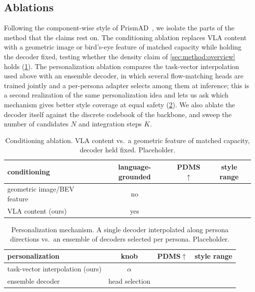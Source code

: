 \subsection{Ablations}
\label{sec:exp:ablate}
Following the component-wise style of PrismAD~\cite{prismad}, we isolate the parts of
the method that the claims rest on. The conditioning ablation replaces VLA content
with a geometric image or bird's-eye feature of matched capacity while holding the
decoder fixed, testing whether the density claim of \cref{sec:method:overview} holds
(\cref{tab:ablate_cond}). The personalization ablation compares the task-vector
interpolation used above with an ensemble decoder, in which several flow-matching
heads are trained jointly and a per-persona adapter selects among them at inference;
this is a second realization of the same personalization idea and lets us ask which
mechanism gives better style coverage at equal safety (\cref{tab:ablate_mech}). We
also ablate the decoder itself against the discrete codebook of the backbone, and
sweep the number of candidates $N$ and integration steps $K$.

\begin{table}[t]
    \centering
    \small
    \setlength{\tabcolsep}{5pt}
    \begin{tabular}{lccc}
        \toprule
        conditioning & language-grounded & PDMS$\uparrow$ & style range \\
        \midrule
        geometric image/BEV feature & no  & \TODO{} & \TODO{} \\
        VLA content (ours)          & yes & \TODO{} & \TODO{} \\
        \bottomrule
    \end{tabular}
    \caption{Conditioning ablation. VLA content vs.\ a geometric feature of matched
    capacity, decoder held fixed. Placeholder.}
    \label{tab:ablate_cond}
\end{table}

\begin{table}[t]
    \centering
    \small
    \setlength{\tabcolsep}{5pt}
    \begin{tabular}{lccc}
        \toprule
        personalization & knob & PDMS$\uparrow$ & style range \\
        \midrule
        task-vector interpolation (ours) & $\alpha$        & \TODO{} & \TODO{} \\
        ensemble decoder                 & head selection  & \TODO{} & \TODO{} \\
        \bottomrule
    \end{tabular}
    \caption{Personalization mechanism. A single decoder interpolated along persona
    directions vs.\ an ensemble of decoders selected per persona. Placeholder.}
    \label{tab:ablate_mech}
\end{table}

